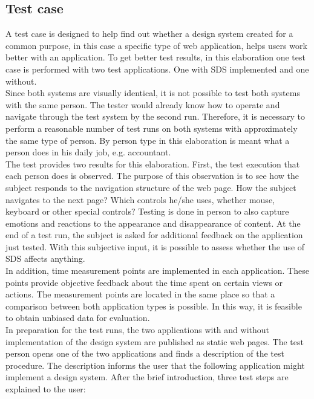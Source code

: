 \subsection{Test case}\label{text_case}
A test case is designed to help find out whether a design system created for a common purpose, in this case a specific type of web application, helps users work better with an application. To get better test results, in this elaboration one test case is performed with two test applications. One with SDS implemented and one without. \\
Since both systems are visually identical, it is not possible to test both systems with the same person. The tester would already know how to operate and navigate through the test system by the second run. Therefore, it is necessary to perform a reasonable number of test runs on both systems with approximately the same type of person. By person type in this elaboration is meant what a person does in his daily job, e.g. accountant.  \\
The test provides two results for this elaboration. First, the test execution that each person does is observed. The purpose of this observation is to see how the subject responds to the navigation structure of the web page. How the subject navigates to the next page? Which controls he/she uses, whether mouse, keyboard or other special controls? Testing is done in person to also capture emotions and reactions to the appearance and disappearance of content. At the end of a test run, the subject is asked for additional feedback on the application just tested. With this subjective input, it is possible to assess whether the use of \ac{SDS} affects anything. \\
In addition, time measurement points are implemented in each application. These points provide objective feedback about the time spent on certain views or actions. The measurement points are located in the same place so that a comparison between both application types is possible.  In this way, it is feasible to obtain unbiased data for evaluation. \\
In preparation for the test runs, the two applications with and without implementation of the design system are published as static web pages. The test person opens one of the two applications and finds a description of the test procedure. The description informs the user that the following application might implement a design system. After the brief introduction, three test steps are explained to the user:

